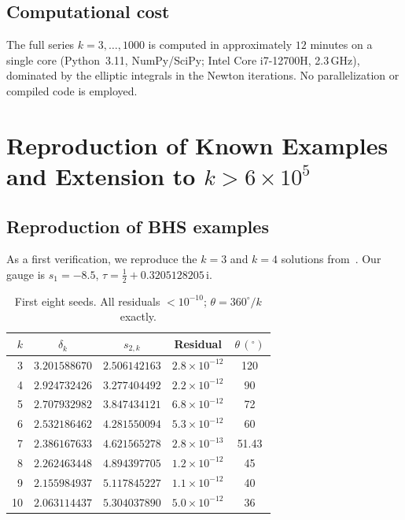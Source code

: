 \documentclass[11pt,a4paper]{article}
\theoremstyle{plain}
\theoremstyle{definition}
\theoremstyle{remark}
\newcommand{\ii}{\mathrm{i}}
\begin{document}
\subsection{Computational cost}
The full series $k = 3, \ldots, 1000$ is computed in approximately
$12$ minutes on a single core (Python~3.11, NumPy/SciPy;
Intel Core i7-12700H, 2.3\,GHz), dominated by
the elliptic integrals in the Newton iterations.  No parallelization
or compiled code is employed.


\section{Reproduction of Known Examples and Extension to
  \texorpdfstring{$k > 6\times 10^5$}{k > 600000}}\label{sec:extension}

\subsection{Reproduction of BHS examples}\label{sec:repro}
As a first verification, we reproduce the $k = 3$ and $k = 4$
solutions from~\cite{BHS25}.  Our gauge is $s_1 = -8.5$,
$\tau = \tfrac12 + 0.3205128205\,\ii$.

\begin{table}[ht]
\centering
\caption{First eight seeds.  All residuals
  $< 10^{-10}$; $\theta = 360^\circ/k$ exactly.}
\label{tab:first-seeds}
\smallskip
\begin{tabular}{@{}rcccc@{}}
\toprule
$k$ & $\delta_k$ & $s_{2,k}$ & Residual & $\theta\,(^\circ)$ \\
\midrule
3  & $3.201588670$ & $2.506142163$ & $2.8 \times 10^{-12}$ & 120 \\
4  & $2.924732426$ & $3.277404492$ & $2.2 \times 10^{-12}$ & 90 \\
5  & $2.707932982$ & $3.847434121$ & $6.8 \times 10^{-12}$ & 72 \\
6  & $2.532186462$ & $4.281550094$ & $5.3 \times 10^{-12}$ & 60 \\
7  & $2.386167633$ & $4.621565278$ & $2.8 \times 10^{-13}$ & 51.43 \\
8  & $2.262463448$ & $4.894397705$ & $1.2 \times 10^{-12}$ & 45 \\
9  & $2.155984937$ & $5.117845227$ & $1.1 \times 10^{-12}$ & 40 \\
10 & $2.063114437$ & $5.304037890$ & $5.0 \times 10^{-12}$ & 36 \\
\bottomrule
\end{tabular}
\end{table}
\end{document}
